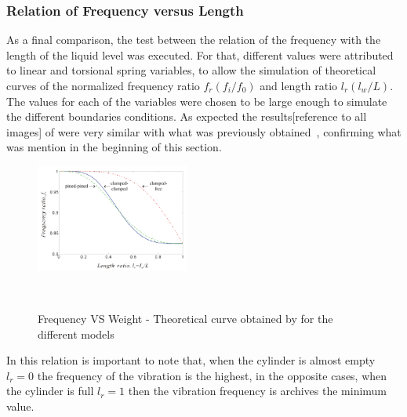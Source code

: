     \subsubsection{Relation of Frequency versus Length}
    As a final comparison, the test between the relation of the frequency with the length of the liquid level was executed. For that, different values were attributed to linear and torsional spring variables, to allow the simulation of theoretical curves of the normalized frequency ratio $f_r (f_i/f_0)$ and length ratio $l_r (l_w/L)$. The values for each of the variables were chosen to be large enough to simulate the different boundaries conditions. As expected the results[reference to all images] of \citeauthor{wuLiquidLevelDetector2014b} were very similar with what was previously obtained~\cite{chanFreeVibrationCantilever1995,chanFREEVIBRATIONSIMPLY1996,jacobsContactlessLiquidDetection2005}, confirming what was mention in the beginning of this section.
    \begin{figure}[]
        \centering
        \includegraphics[width=0.45\textwidth]{Chapters/2CHP/Diagrams/theoricalcurve.pdf}
        \caption{Frequency VS Weight - Theoretical curve obtained by for the different models}{~\cite{wuLiquidLevelDetector2014b}}
        \label{fig:theoCurves}
    \end{figure}
    In this relation is important to note that, when the cylinder is almost empty $l_r = 0$ the frequency of the vibration is the highest, in the opposite cases, when the cylinder is full $l_r = 1$ then the vibration frequency is archives the minimum value. 
